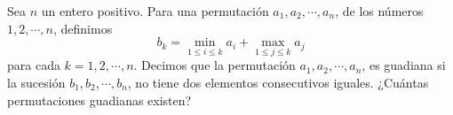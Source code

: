 Sea $n$ un entero positivo. Para una permutación $a_1, a_2, \cdots , a_n$, de los números $1,2, \cdots , n$, definimos
\[ b_k = \min_{1 \leq i \leq k} a_i + \max_{1 \leq j \leq k} a_j \]
para cada $k = 1,2, \cdots ,n$. Decimos que la permutación $a_1, a_2, \cdots , a_n$, es guadiana si la sucesión $b_1, b_2, \cdots, b_n$, no tiene dos elementos consecutivos iguales. ¿Cuántas permutaciones guadianas existen?
